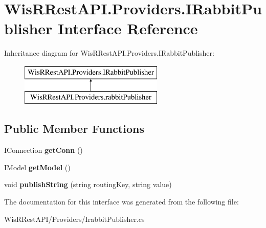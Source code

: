 \hypertarget{interface_wis_r_rest_a_p_i_1_1_providers_1_1_i_rabbit_publisher}{}\section{Wis\+R\+Rest\+A\+P\+I.\+Providers.\+I\+Rabbit\+Publisher Interface Reference}
\label{interface_wis_r_rest_a_p_i_1_1_providers_1_1_i_rabbit_publisher}
Inheritance diagram for Wis\+R\+Rest\+A\+P\+I.\+Providers.\+I\+Rabbit\+Publisher\+:\begin{figure}[H]
\begin{center}
\leavevmode
\includegraphics[height=2.000000cm]{interface_wis_r_rest_a_p_i_1_1_providers_1_1_i_rabbit_publisher}
\end{center}
\end{figure}
\subsection*{Public Member Functions}
\begin{DoxyCompactItemize}
\item 
\hypertarget{interface_wis_r_rest_a_p_i_1_1_providers_1_1_i_rabbit_publisher_ab80a9530895d6f81fff93773b77071c3}{}I\+Connection {\bfseries get\+Conn} ()\label{interface_wis_r_rest_a_p_i_1_1_providers_1_1_i_rabbit_publisher_ab80a9530895d6f81fff93773b77071c3}

\item 
\hypertarget{interface_wis_r_rest_a_p_i_1_1_providers_1_1_i_rabbit_publisher_a7d641172b39a5b2bbbf2298019a72e9f}{}I\+Model {\bfseries get\+Model} ()\label{interface_wis_r_rest_a_p_i_1_1_providers_1_1_i_rabbit_publisher_a7d641172b39a5b2bbbf2298019a72e9f}

\item 
\hypertarget{interface_wis_r_rest_a_p_i_1_1_providers_1_1_i_rabbit_publisher_a43fe4965110034863f81b25e3ac2b8ac}{}void {\bfseries publish\+String} (string routing\+Key, string value)\label{interface_wis_r_rest_a_p_i_1_1_providers_1_1_i_rabbit_publisher_a43fe4965110034863f81b25e3ac2b8ac}

\end{DoxyCompactItemize}


The documentation for this interface was generated from the following file\+:\begin{DoxyCompactItemize}
\item 
Wis\+R\+Rest\+A\+P\+I/\+Providers/Irabbit\+Publisher.\+cs\end{DoxyCompactItemize}
